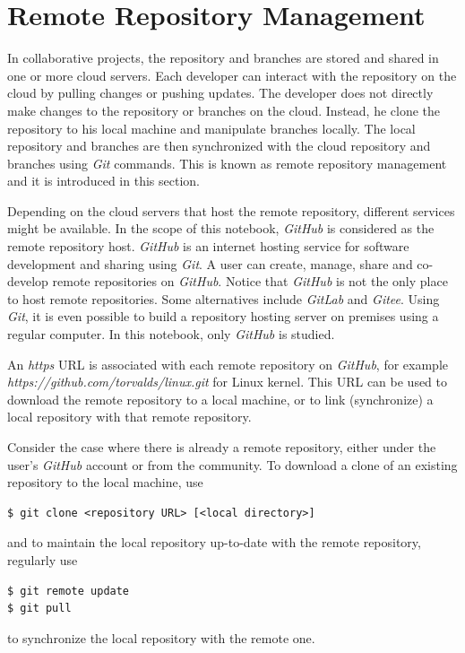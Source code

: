 \section{Remote Repository Management} \label{ch:sma:sec:rrm}

In collaborative projects, the repository and branches are stored and shared in one or more cloud servers. Each developer can interact with the repository on the cloud by pulling changes or pushing updates. The developer does not directly make changes to the repository or branches on the cloud. Instead, he clone the repository to his local machine and manipulate branches locally. The local repository and branches are then synchronized with the cloud repository and branches using \textit{Git} commands. This is known as remote repository management and it is introduced in this section.

Depending on the cloud servers that host the remote repository, different services might be available. In the scope of this notebook, \textit{GitHub} is considered as the remote repository host. \textit{GitHub} is an internet hosting service for software development and sharing using \textit{Git}. A user can create, manage, share and co-develop remote repositories on \textit{GitHub}. Notice that \textit{GitHub} is not the only place to host remote repositories. Some alternatives include \textit{GitLab} and \textit{Gitee}. Using \textit{Git}, it is even possible to build a repository hosting server on premises using a regular computer. In this notebook, only \textit{GitHub} is studied.

An \textit{https} URL is associated with each remote repository on \textit{GitHub}, for example \textit{https://github.com/torvalds/linux.git} for Linux kernel. This URL can be used to download the remote repository to a local machine, or to link (synchronize) a local repository with that remote repository.

Consider the case where there is already a remote repository, either under the user's \textit{GitHub} account or from the community. To download a clone of an existing repository to the local machine, use
\begin{lstlisting}
$ git clone <repository URL> [<local directory>]
\end{lstlisting}
and to maintain the local repository up-to-date with the remote repository, regularly use
\begin{lstlisting}
$ git remote update
$ git pull
\end{lstlisting}
to synchronize the local repository with the remote one.

